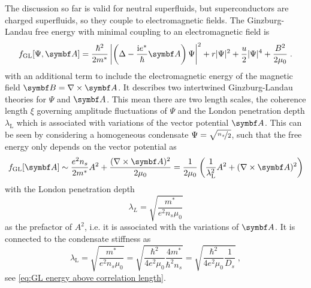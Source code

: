 \documentclass[../notes.tex]{subfiles}
\begin{document}
The discussion so far is valid for neutral superfluids, but superconductors are charged superfluids, so they couple to electromagnetic fields.
The Ginzburg-Landau free energy with minimal coupling to an electromagnetic field is
\begin{equation}
	f_{\mathrm{GL}} [\Psi, \vb{A}] = \frac{\hbar^2}{2 m^*} \left\vert \left( \Delta - \frac{\iu e^*}{\hbar} \vb{A} \right) \Psi \right\vert^2 + r \vert \Psi \vert^2 + \frac{u}{2} \vert \Psi \vert^4 + \frac{B^2}{2 \mu_0}
	\label{eq:GL energy with minimal coupling to EM field} \;.
\end{equation}
with an additional term to include the electromagnetic energy of the magnetic field \(\vb{B} = \nabla \times \vb{A}\).
It describes two intertwined Ginzburg-Landau theories for \(\Psi\) and \(\vb{A}\).
This mean there are two length scales, the coherence length \(\xi\) governing amplitude fluctuations of \(\Psi\) and the London penetration depth \(\lambda_{\mathrm{L}}\) which is associated with variations of the vector potential \(\vb{A}\).
This can be seen by considering a homogeneous condensate \(\Psi = \sqrt{\nicefrac{n_s}{2}}\), such that the free energy only depends on the vector potential as
\begin{equation}
	f_{\mathrm{GL}} [\vb{A}] \sim \frac{e^2 n_s}{2 m^*} A^2 + \frac{(\nabla \times \vb{A})^2}{2 \mu_0} = \frac{1}{2 \mu_0} \left( \frac{1}{\lambda_{\mathrm{L}}^2} A^2 + (\nabla \times \vb{A})^2 \right)
\end{equation}
with the London penetration depth
\begin{equation}
	\lambda_L = \sqrt{\frac{m^*}{e^2 n_s \mu_0}}
\end{equation}
as the prefactor of \(A^2\), i.e. it is associated with the variations of \(\vb{A}\).
It is connected to the condensate stiffness as
\begin{equation}
	\lambda_{\mathrm{L}} = \sqrt{\frac{m^*}{e^2 n_s \mu_0}} = \sqrt{\frac{\hbar^2}{4 e^2 \mu_0} \frac{4 m^*}{\hbar^2 n_s}} = \sqrt{\frac{\hbar^2}{4 e^2 \mu_0} \frac{1}{D_s}} \:,
	\label{eq:London penetration depth and D_S}
\end{equation}
see \cref{eq:GL energy above correlation length}.
\end{document}
